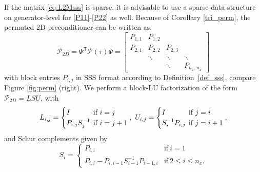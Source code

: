 {If the matrix \eqref{eq:L2Msss} is sparse, it is advisable to use a sparse data structure on generator-level for \eqref{P11}-\eqref{P22} as well. Because of Corollary \ref{tri_perm}, the permuted 2D preconditioner can be written as,
\begin{equation}
\label{eq:perm_precon}
         \mathcal{P}_{2D}= \Psi^\mathsf{T} \mathcal{P}(\tau) \Psi =\begin{bmatrix}
                     P_{1,1} & P_{1,2} &         &        \\
                     P_{2,1} & P_{2,2} & P_{2,3} &        \\
                                     & \ddots  & \ddots & \ddots \\
                                     &         & \ddots & P_{n_x, n_x}
                 \end{bmatrix}
\end{equation}
with block entries $P_{i,j}$ in SSS format according to \mbox{Definition \ref{def_sss}}, compare Figure \ref{fig:perm} (right). We perform a block-LU factorization of the form $\mathcal{P}_{2D} = L S U$, with 
\begin{equation}
\label{eq:full_Schur}
        L_{i,j}=\begin{cases}
             I &\hspace{-0.2cm} \text{if}\ i=j \\
             P_{i,j}S_j^{-1} &\hspace{-0.2cm} \text{if}\ i = j+1
	     \end{cases}, \
	U_{i,j}=\begin{cases}
             I &\hspace{-0.2cm} \text{if}\ j=i \\
             S_i^{-1}P_{i,j} &\hspace{-0.2cm} \text{if}\ j = i+1
	     \end{cases},     
\end{equation}
and Schur complements given by
\begin{equation}\label{eqn_schur}
        S_i=\begin{cases}
             P_{i,i} & \text{if}\ i=1 \\
             P_{i,i}-P_{i,i-1}S_{i-1}^{-1}P_{i-1,i} & \text{if}\ 2\leq i\leq n_x.
	     \end{cases}
\end{equation}

}
